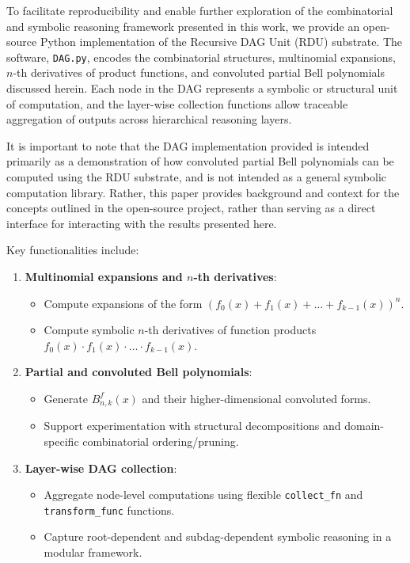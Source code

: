 \documentclass[11pt]{article}
\theoremstyle{plain}
\theoremstyle{definition}
\begin{document}
To facilitate reproducibility and enable further exploration of the combinatorial and symbolic reasoning framework presented in this work, we provide an open-source Python implementation of the Recursive DAG Unit (RDU) substrate. The software, \texttt{DAG.py}, encodes the combinatorial structures, multinomial expansions, $n$-th derivatives of product functions, and convoluted partial Bell polynomials discussed herein. Each node in the DAG represents a symbolic or structural unit of computation, and the layer-wise collection functions allow traceable aggregation of outputs across hierarchical reasoning layers.

It is important to note that the DAG implementation provided is intended primarily as a demonstration of how convoluted partial Bell polynomials can be computed using the RDU substrate, and is not intended as a general symbolic computation library. Rather, this paper provides background and context for the concepts outlined in the open-source project, rather than serving as a direct interface for interacting with the results presented here.

Key functionalities include:

\begin{enumerate}
    \item \textbf{Multinomial expansions and $n$-th derivatives}:
    \begin{itemize}
        \item Compute expansions of the form $(f_0(x) + f_1(x) + \dots + f_{k-1}(x))^n$.
        \item Compute symbolic $n$-th derivatives of function products $f_0(x) \cdot f_1(x) \cdot \dots \cdot f_{k-1}(x)$.
    \end{itemize}
    
    \item \textbf{Partial and convoluted Bell polynomials}:
    \begin{itemize}
        \item Generate $B_{n,k}^f(x)$ and their higher-dimensional convoluted forms.
        \item Support experimentation with structural decompositions and domain-specific combinatorial ordering/pruning.
    \end{itemize}
    
    \item \textbf{Layer-wise DAG collection}:
    \begin{itemize}
        \item Aggregate node-level computations using flexible \texttt{collect\_fn} and \texttt{transform\_func} functions.
        \item Capture root-dependent and subdag-dependent symbolic reasoning in a modular framework.
    \end{itemize}
\end{enumerate}
\end{document}
